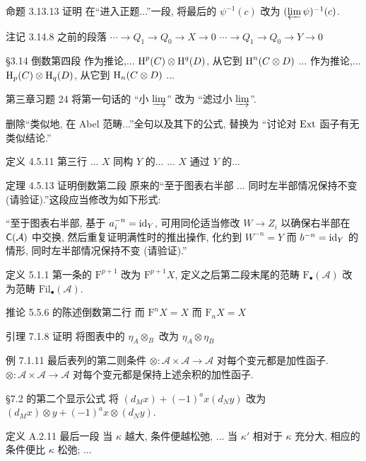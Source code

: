\documentclass{AJerrata}
\begin{document}
\begin{Errata}
		\item[命题 3.13.13 证明]
		在``进入正题...''一段, 将最后的 $\psi^{-1}(c)$ 改为 $(\varprojlim \psi)^{-1}(c)$.
		
		\item[注记 3.14.8 之前的段落]
		\Orig $\cdots \to Q_1 \to Q_0 \to X \to 0$
		\Corr $\cdots \to Q_1 \to Q_0 \to Y \to 0$
		
		\item[\S 3.14 倒数第四段]
		\Orig 作为推论,... $\operatorname{H}^p(C) \otimes \operatorname{H}^q(D)$, 从它到 $\operatorname{H}^n(C \otimes D)$ ...
		\Corr 作为推论,... $\operatorname{H}_p(C) \otimes \operatorname{H}_q(D)$, 从它到 $\operatorname{H}_n(C \otimes D)$ ...
		
		\item[第三章习题 24]
		将第一句话的 ``小 $\varinjlim$'' 改为 ``滤过小 $\varinjlim$''.
		
		删除``类似地, 在 Abel 范畴...''全句以及其下的公式, 替换为 ``讨论对 $\operatorname{Ext}$ 函子有无类似结论.''
		
		\item[定义 4.5.11 第三行]
		\Orig ... $X$ 同构 $Y$ 的...
		\Corr ... $X$ 通过 $Y$ 的...
		
		\item[定理 4.5.13 证明倒数第二段]
		原来的``至于图表右半部 ... 同时左半部情况保持不变 (请验证).''这段应当修改为如下形式:
		
		``至于图表右半部, 基于 $a_i^{-n} = \mathrm{id}_Y$, 可用同伦适当修改 $W \to Z_i$ 以确保右半部在 $\mathsf{C}(\mathcal{A})$ 中交换, 然后重复证明满性时的推出操作, 化约到 $W^{-n} = Y$ 而 $b^{-n} = \mathrm{id}_Y$ 的情形, 同时左半部情况保持不变 (请验证).''
		
		\item[定义 5.1.1]
		第一条的 $\mathrm{F}^{p+1}$ 改为 $\mathrm{F}^{p+1} X$, 定义之后第二段末尾的范畴 $\mathrm{F}_{\bullet}(\mathcal{A})$ 改为范畴 $\mathrm{Fil}_{\bullet}(\mathcal{A})$.
		
		\item[推论 5.5.6 的陈述倒数第二行]
		\Orig 而 $\mathrm{F}^n X = X$
		\Corr 而 $\mathrm{F}_n X = X$
		
		\item[引理 7.1.8 证明]
		将图表中的 $\eta_A \otimes_B$ 改为 $\eta_A \otimes \eta_B$
		
		\item[例 7.1.11 最后表列的第二则条件]
		\Orig $\otimes: \mathcal{A} \times \mathcal{A} \to \mathcal{A}$ 对每个变元都是加性函子.
		\Corr $\otimes: \mathcal{A} \times \mathcal{A} \to \mathcal{A}$ 对每个变元都是保持上述余积的加性函子.
		
		\item[\S 7.2 的第二个显示公式]
		将 $(d_M x) + (-1)^a x (d_N y)$ 改为 $(d_M x) \otimes y + (-1)^a x \otimes (d_N y)$.
			
		\item[定义 A.2.11 最后一段]
		\Orig 当 $\kappa$ 越大, 条件便越松弛, ...
		\Corr 当 $\kappa'$ 相对于 $\kappa$ 充分大, 相应的条件便比 $\kappa$ 松弛; ...
	\end{Errata}
\end{document}

